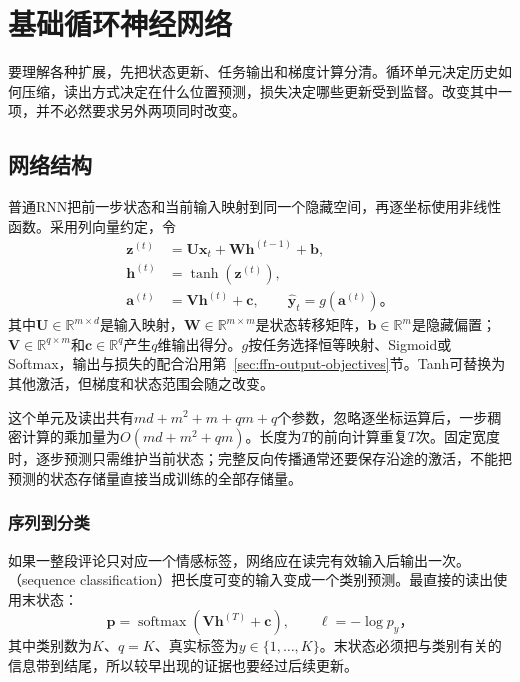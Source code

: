 \section{基础循环神经网络}
\label{sec:rnn-basic}

要理解各种扩展，先把状态更新、任务输出和梯度计算分清。循环单元决定历史如何压缩，读出方式决定在什么位置预测，损失决定哪些更新受到监督。改变其中一项，并不必然要求另外两项同时改变。

\subsection{网络结构}
\label{sec:rnn-structure}

普通RNN把前一步状态和当前输入映射到同一个隐藏空间，再逐坐标使用非线性函数。采用列向量约定，令
\begin{equation}
  \begin{aligned}
    \bm{z}^{(t)}&=\bm{U}\bm{x}_t+\bm{W}\bm{h}^{(t-1)}+\bm{b},\\
    \bm{h}^{(t)}&=\tanh\!\left(\bm{z}^{(t)}\right),\\
    \bm{a}^{(t)}&=\bm{V}\bm{h}^{(t)}+\bm{c},\qquad
    \widehat{\bm{y}}_t=g\!\left(\bm{a}^{(t)}\right)\text{。}
  \end{aligned}
  \label{eq:rnn-basic-cell}
\end{equation}
其中$\bm{U}\in\mathbb{R}^{m\times d}$是输入映射，$\bm{W}\in\mathbb{R}^{m\times m}$是状态转移矩阵，$\bm{b}\in\mathbb{R}^{m}$是隐藏偏置；$\bm{V}\in\mathbb{R}^{q\times m}$和$\bm{c}\in\mathbb{R}^{q}$产生$q$维输出得分。$g$按任务选择恒等映射、Sigmoid或Softmax，输出与损失的配合沿用第~\ref{sec:ffn-output-objectives}节。Tanh可替换为其他激活，但梯度和状态范围会随之改变。

这个单元及读出共有$md+m^2+m+qm+q$个参数，忽略逐坐标运算后，一步稠密计算的乘加量为$O(md+m^2+qm)$。长度为$T$的前向计算重复$T$次。固定宽度时，逐步预测只需维护当前状态；完整反向传播通常还要保存沿途的激活，不能把预测的状态存储量直接当成训练的全部存储量。

\subsubsection{序列到分类}
\label{sec:rnn-sequence-classification}

如果一整段评论只对应一个情感标签，网络应在读完有效输入后输出一次。（sequence classification）把长度可变的输入变成一个类别预测。最直接的读出使用末状态：
\begin{equation}
  \bm{p}=\operatorname{softmax}\!\left(\bm{V}\bm{h}^{(T)}+\bm{c}\right),
  \qquad \ell=-\log p_y\text{，}
  \label{eq:rnn-classification}
\end{equation}
其中类别数为$K$、$q=K$、真实标签为$y\in\{1,\ldots,K\}$。末状态必须把与类别有关的信息带到结尾，所以较早出现的证据也要经过后续更新。

